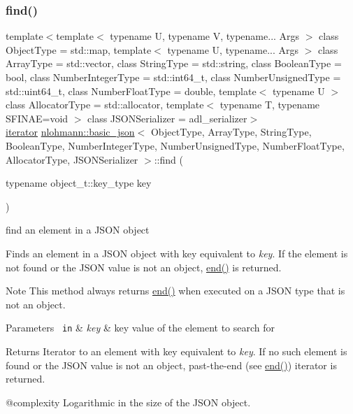 \subsubsection{\texorpdfstring{find()}{find()}\hspace{0.1cm}{\footnotesize\ttfamily [1/2]}}
{\footnotesize\ttfamily template$<$template$<$ typename U, typename V, typename... Args $>$ class Object\+Type = std\+::map, template$<$ typename U, typename... Args $>$ class Array\+Type = std\+::vector, class String\+Type  = std\+::string, class Boolean\+Type  = bool, class Number\+Integer\+Type  = std\+::int64\+\_\+t, class Number\+Unsigned\+Type  = std\+::uint64\+\_\+t, class Number\+Float\+Type  = double, template$<$ typename U $>$ class Allocator\+Type = std\+::allocator, template$<$ typename T, typename S\+F\+I\+N\+A\+E=void $>$ class J\+S\+O\+N\+Serializer = adl\+\_\+serializer$>$ \\
\mbox{\hyperlink{classnlohmann_1_1basic__json_a099316232c76c034030a38faa6e34dca}{iterator}} \mbox{\hyperlink{classnlohmann_1_1basic__json}{nlohmann\+::basic\+\_\+json}}$<$ Object\+Type, Array\+Type, String\+Type, Boolean\+Type, Number\+Integer\+Type, Number\+Unsigned\+Type, Number\+Float\+Type, Allocator\+Type, J\+S\+O\+N\+Serializer $>$\+::find (\begin{DoxyParamCaption}\item[{typename object\+\_\+t\+::key\+\_\+type}]{key }\end{DoxyParamCaption})\hspace{0.3cm}{\ttfamily [inline]}}



find an element in a J\+S\+ON object 

Finds an element in a J\+S\+ON object with key equivalent to {\itshape key}. If the element is not found or the J\+S\+ON value is not an object, \mbox{\hyperlink{classnlohmann_1_1basic__json_a13e032a02a7fd8a93fdddc2fcbc4763c}{end()}} is returned.

\begin{DoxyNote}{Note}
This method always returns \mbox{\hyperlink{classnlohmann_1_1basic__json_a13e032a02a7fd8a93fdddc2fcbc4763c}{end()}} when executed on a J\+S\+ON type that is not an object.
\end{DoxyNote}

\begin{DoxyParams}[1]{Parameters}
\mbox{\texttt{ in}}  & {\em key} & key value of the element to search for\\
\hline
\end{DoxyParams}
\begin{DoxyReturn}{Returns}
Iterator to an element with key equivalent to {\itshape key}. If no such element is found or the J\+S\+ON value is not an object, past-\/the-\/end (see \mbox{\hyperlink{classnlohmann_1_1basic__json_a13e032a02a7fd8a93fdddc2fcbc4763c}{end()}}) iterator is returned.
\end{DoxyReturn}
@complexity Logarithmic in the size of the J\+S\+ON object.

